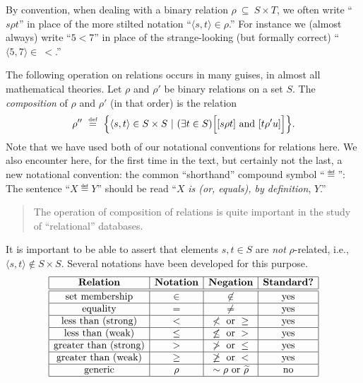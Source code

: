 By convention, when dealing with a binary relation $\rho \ \subseteq
\ S \times T$, we often write ``$s \rho t$'' in place of the more stilted notation
``$\langle s, t \rangle \in \rho$.''  For instance we (almost always)
write ``$5 < 7$'' in place of the strange-looking (but formally
correct) ``$\langle 5,7 \rangle \in \ <$.''

The following operation on relations occurs in many guises, in almost
all mathematical theories.  Let $\rho$ and $\rho'$ be binary relations
on a set $S$.  The {\it composition}
of $\rho$ and $\rho'$ (in that order) is the relation
\[ 
\rho'' \ \eqdef \ \Bigl\{ \langle s, t \rangle \in S \times S \ | \
(\exists t \in S) \Bigl[ [s \rho t] \mbox{ and } [t \rho' u] \Bigr] \Bigr\}.
\]
Note that we have used both of our notational conventions for
relations here.  We also encounter here, for the first time in the
text, but certainly not the last, a new notational convention: the
common ``shorthand'' compound symbol ``$\eqdef$'':
The sentence ``$X \eqdef Y$'' should be read ``$X$ {\em is (or, equals),
  by definition}, $Y$.''
\begin{quote}
The operation of composition of relations is quite important in the
study of ``relational'' databases.
\end{quote}

\noindent
It is important to be able to assert that elements $s, t \in S$ are
{\em not} $\rho$-related,\index{relation negation} i.e., $\langle s, t
\rangle \not\in S \times S$.  Several notations have been developed
for this purpose.
\begin{equation}
\label{eq:NOT-rho-notation}
\begin{array}{|c|c|c|c|}
\hline
\mbox{\bf Relation} & \mbox{\bf Notation} & \mbox{\bf Negation} &
\mbox{\bf Standard?} \\
\hline
\hline
\mbox{set membership} & \in & \not\in & \mbox{yes} \\
\hline
\mbox{equality}       & =   & \neq    & \mbox{yes} \\
\hline
\mbox{less than (strong)} & < & \not < \mbox{ or } \geq & \mbox{yes} \\
\hline
\mbox{less than (weak)} & \leq & \not\leq \mbox{ or } > & \mbox{yes} \\
\hline
\mbox{greater than (strong)} & > & \not > \mbox{ or } \leq & \mbox{yes} \\
\hline
\mbox{greater than (weak)} & \geq & \not\geq \mbox{ or } < & \mbox{yes} \\
\hline
\mbox{generic}  & \rho  & \sim\rho \mbox{ or } \widetilde{\rho} &
\mbox{no} \\
\hline
\end{array}
\end{equation}

